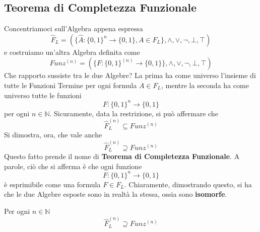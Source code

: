 \subsection{Teorema di Completezza Funzionale}
Concentriamoci sull'Algebra appena espressa
$$
\hat{F}_L = (\{\hat{A}: \{0,1\}^n \rightarrow \{0,1\}, A \in F_L\}, \land, \lor, \neg, \bot, \top) 
$$
e costruiamo un'altra Algebra definita come
$$
Funz^{(n)} = (\{F: \{0,1\}^{(n)} \rightarrow \{0,1\}\}, \land, \lor, \neg, \bot, \top)
$$
Che rapporto sussiste tra le due Algebre?
La prima ha come universo l'insieme di tutte le Funzioni Termine per ogni 
formula $A \in F_L$, mentre la seconda ha come universo tutte le funzioni
$$
F: \{0,1\}^n \rightarrow \{0,1\}
$$
per ogni $n \in \mathbb{N}$.
Sicuramente, data la restrizione, si può affermare che 
$$
\hat{F}_L^{(n)} \subseteq Funz^{(n)}
$$
Si dimostra, ora, che vale anche
$$
\hat{F}_L^{(n)} \supseteq Funz^{(n)}
$$
Questo fatto prende il nome di \textbf{Teorema di Completezza Funzionale}. 
A parole, ciò che si afferma è che ogni funzione 
$$
F: \{0,1\}^n \rightarrow \{0,1\}
$$
è esprimibile come una formula $F \in F_L$.
Chiaramente, dimostrando questo, si ha che le due Algebre esposte 
sono in realtà la stessa, ossia sono \textbf{isomorfe}. 
\begin{teo}
        Per ogni $n \in \mathbb{N}$
        $$
                \hat{F}_L^{(n)} \supseteq Funz^{(n)}
        $$
\end{teo}

